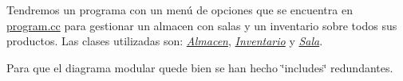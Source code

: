 Tendremos un programa con un menú de opciones que se encuentra en \hyperlink{program_8cc}{program.\+cc} para gestionar un almacen con salas y un inventario sobre todos sus productos. Las clases utilizadas son\+: {\itshape \hyperlink{class_almacen}{Almacen}}, {\itshape \hyperlink{class_inventario}{Inventario}} y {\itshape \hyperlink{class_sala}{Sala}}.


\begin{DoxyItemize}
\item Para que el diagrama modular quede bien se han hecho \char`\"{}includes\char`\"{} redundantes. 
\end{DoxyItemize}